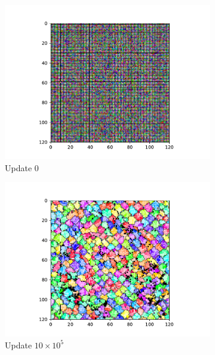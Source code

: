 \begin{figure}[t]
\begin{center}
\begin{subfigure}[b]{0.5\columnwidth}
  \includegraphics[width=\columnwidth,trim={2.5cm 0.5cm 2.5cm 1cm},clip]{img/ChannelMap_1011_update0}
  \caption{Update 0}
  \label{fig:ChannelMap_1011_update0}
\end{subfigure}%
\begin{subfigure}[b]{0.5\columnwidth}
  \includegraphics[width=\columnwidth,trim={2.5cm 0.5cm 2.5cm 1cm},clip]{img/ChannelMap_1011_update1000000}
  \caption{Update $10 \times 10^{5}$}
  \label{fig:ChannelMap_1011_update1000000}
\end{subfigure}
\begin{subfigure}[b]{0.5\columnwidth}

\end{subfigure}
\end{center}
\end{figure}
